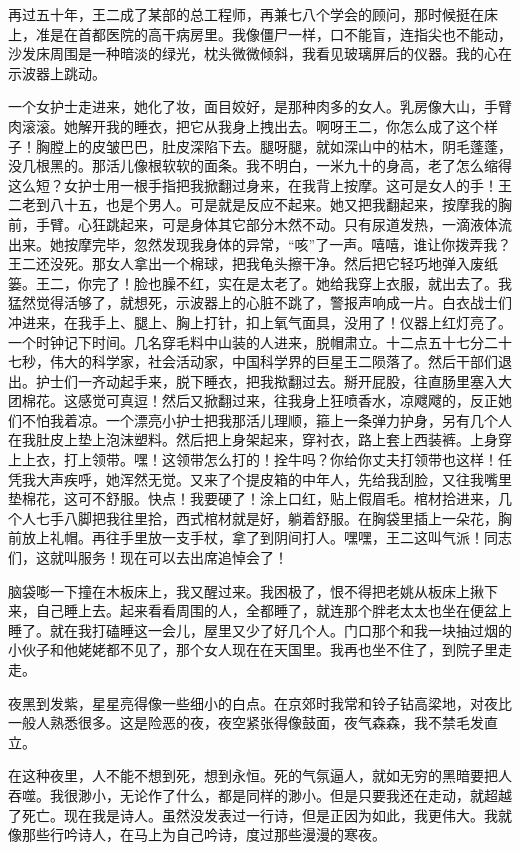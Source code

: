  再过五十年，王二成了某部的总工程师，再兼七八个学会的顾问，那时候挺在床上，准是在首都医院的高干病房里。我像僵尸一样，口不能盲，连指尖也不能动，沙发床周围是一种暗淡的绿光，枕头微微倾斜，我看见玻璃屏后的仪器。我的心在示波器上跳动。 
 
 一个女护士走进来，她化了妆，面目姣好，是那种肉多的女人。乳房像大山，手臂肉滚滚。她解开我的睡衣，把它从我身上拽出去。啊呀王二，你怎么成了这个样子！胸膛上的皮皱巴巴，肚皮深陷下去。腿呀腿，就如深山中的枯木，阴毛蓬蓬，没几根黑的。那活儿像根软软的面条。我不明白，一米九十的身高，老了怎么缩得这么短？女护士用一根手指把我掀翻过身来，在我背上按摩。这可是女人的手！王二老到八十五，也是个男人。可是就是反应不起来。她又把我翻起来，按摩我的胸前，手臂。心狂跳起来，可是身体其它部分木然不动。只有尿道发热，一滴液体流出来。她按摩完毕，忽然发现我身体的异常，“咳”了一声。嘻嘻，谁让你拨弄我？王二还没死。那女人拿出一个棉球，把我龟头擦干净。然后把它轻巧地弹入废纸篓。王二，你完了！脸也臊不红，实在是太老了。她给我穿上衣服，就出去了。我猛然觉得活够了，就想死，示波器上的心脏不跳了，警报声响成一片。白衣战士们冲进来，在我手上、腿上、胸上打针，扣上氧气面具，没用了！仪器上红灯亮了。一个时钟记下时间。几名穿毛料中山装的人进来，脱帽肃立。十二点五十七分二十七秒，伟大的科学家，社会活动家，中国科学界的巨星王二陨落了。然后干部们退出。护士们一齐动起手来，脱下睡衣，把我揿翻过去。掰开屁股，往直肠里塞入大团棉花。这感觉可真逗！然后又掀翻过来，往我身上狂喷香水，凉飕飕的，反正她们不怕我着凉。一个漂亮小护士把我那活儿理顺，箍上一条弹力护身，另有几个人在我肚皮上垫上泡沫塑料。然后把上身架起来，穿衬衣，路上套上西装裤。上身穿上上衣，打上领带。嘿！这领带怎么打的！拴牛吗？你给你丈夫打领带也这样！任凭我大声疾呼，她浑然无觉。又来了个提皮箱的中年人，先给我刮脸，又往我嘴里垫棉花，这可不舒服。快点！我要硬了！涂上口红，贴上假眉毛。棺材拾进来，几个人七手八脚把我往里拾，西式棺材就是好，躺着舒服。在胸袋里插上一朵花，胸前放上礼帽。再往手里放一支手杖，拿了到阴间打人。嘿嘿，王二这叫气派！同志们，这就叫服务！现在可以去出席追悼会了！ 
 
 脑袋嘭一下撞在木板床上，我又醒过来。我困极了，恨不得把老姚从板床上揪下来，自己睡上去。起来看看周围的人，全都睡了，就连那个胖老太太也坐在便盆上睡了。就在我打磕睡这一会儿，屋里又少了好几个人。门口那个和我一块抽过烟的小伙子和他姥姥都不见了，那个女人现在在天国里。我再也坐不住了，到院子里走走。 
 
 夜黑到发紫，星星亮得像一些细小的白点。在京郊时我常和铃子钻高梁地，对夜比一般人熟悉很多。这是险恶的夜，夜空紧张得像鼓面，夜气森森，我不禁毛发直立。 
 
 在这种夜里，人不能不想到死，想到永恒。死的气氛逼人，就如无穷的黑暗要把人吞噬。我很渺小，无论作了什么，都是同样的渺小。但是只要我还在走动，就超越了死亡。现在我是诗人。虽然没发表过一行诗，但是正因为如此，我更伟大。我就像那些行吟诗人，在马上为自己吟诗，度过那些漫漫的寒夜。 
 

